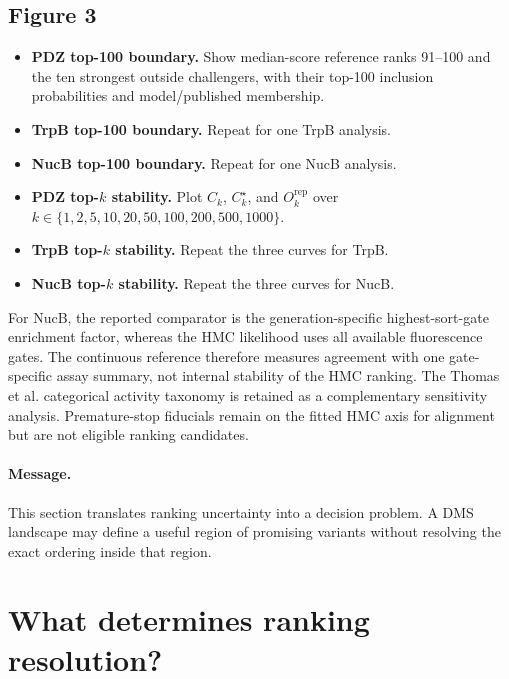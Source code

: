 \documentclass[11pt]{article}
\begin{document}
\subsection*{Figure 3}

\begin{itemize}
  \item[\textbf{(a)}] \textbf{PDZ top-100 boundary.} Show median-score reference ranks 91--100 and the ten strongest outside challengers, with their top-100 inclusion probabilities and model/published membership.
  \item[\textbf{(b)}] \textbf{TrpB top-100 boundary.} Repeat for one TrpB analysis.
  \item[\textbf{(c)}] \textbf{NucB top-100 boundary.} Repeat for one NucB analysis.
  \item[\textbf{(d)}] \textbf{PDZ top-$k$ stability.} Plot $C_k$, $C_k^\star$, and $O_k^{\mathrm{rep}}$ over $k \in \{1,2,5,10,20,50,100,200,500,1000\}$.
  \item[\textbf{(e)}] \textbf{TrpB top-$k$ stability.} Repeat the three curves for TrpB.
  \item[\textbf{(f)}] \textbf{NucB top-$k$ stability.} Repeat the three curves for NucB.
\end{itemize}

For NucB, the reported comparator is the generation-specific highest-sort-gate enrichment factor, whereas the HMC likelihood uses all available fluorescence gates. The continuous reference therefore measures agreement with one gate-specific assay summary, not internal stability of the HMC ranking. The Thomas et al. categorical activity taxonomy is retained as a complementary sensitivity analysis. Premature-stop fiducials remain on the fitted HMC axis for alignment but are not eligible ranking candidates.

\paragraph{Message.}
This section translates ranking uncertainty into a decision problem. A DMS landscape may define a useful region of promising variants without resolving the exact ordering inside that region.

\section{What determines ranking resolution?}
\end{document}
